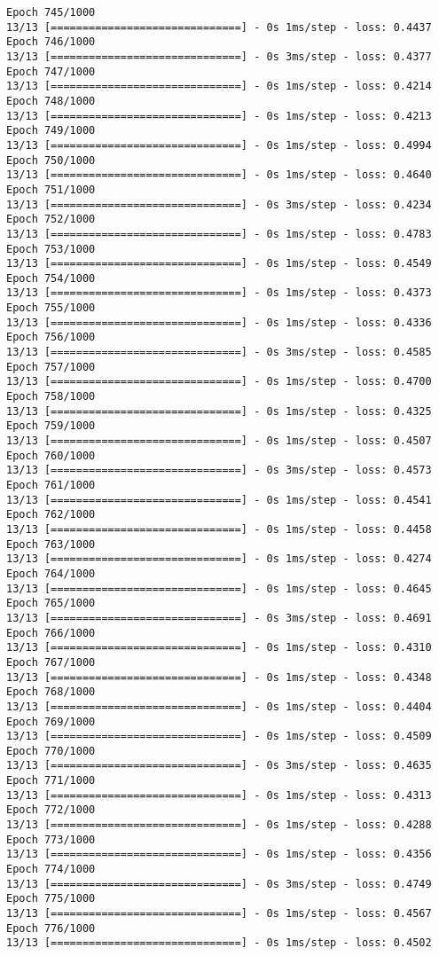 \documentclass[11pt]{article}
\begin{document}
\begin{Verbatim}[commandchars=\\\{\}]
Epoch 745/1000
13/13 [==============================] - 0s 1ms/step - loss: 0.4437
Epoch 746/1000
13/13 [==============================] - 0s 3ms/step - loss: 0.4377
Epoch 747/1000
13/13 [==============================] - 0s 1ms/step - loss: 0.4214
Epoch 748/1000
13/13 [==============================] - 0s 1ms/step - loss: 0.4213
Epoch 749/1000
13/13 [==============================] - 0s 1ms/step - loss: 0.4994
Epoch 750/1000
13/13 [==============================] - 0s 1ms/step - loss: 0.4640
Epoch 751/1000
13/13 [==============================] - 0s 3ms/step - loss: 0.4234
Epoch 752/1000
13/13 [==============================] - 0s 1ms/step - loss: 0.4783
Epoch 753/1000
13/13 [==============================] - 0s 1ms/step - loss: 0.4549
Epoch 754/1000
13/13 [==============================] - 0s 1ms/step - loss: 0.4373
Epoch 755/1000
13/13 [==============================] - 0s 1ms/step - loss: 0.4336
Epoch 756/1000
13/13 [==============================] - 0s 3ms/step - loss: 0.4585
Epoch 757/1000
13/13 [==============================] - 0s 1ms/step - loss: 0.4700
Epoch 758/1000
13/13 [==============================] - 0s 1ms/step - loss: 0.4325
Epoch 759/1000
13/13 [==============================] - 0s 1ms/step - loss: 0.4507
Epoch 760/1000
13/13 [==============================] - 0s 3ms/step - loss: 0.4573
Epoch 761/1000
13/13 [==============================] - 0s 1ms/step - loss: 0.4541
Epoch 762/1000
13/13 [==============================] - 0s 1ms/step - loss: 0.4458
Epoch 763/1000
13/13 [==============================] - 0s 1ms/step - loss: 0.4274
Epoch 764/1000
13/13 [==============================] - 0s 1ms/step - loss: 0.4645
Epoch 765/1000
13/13 [==============================] - 0s 3ms/step - loss: 0.4691
Epoch 766/1000
13/13 [==============================] - 0s 1ms/step - loss: 0.4310
Epoch 767/1000
13/13 [==============================] - 0s 1ms/step - loss: 0.4348
Epoch 768/1000
13/13 [==============================] - 0s 1ms/step - loss: 0.4404
Epoch 769/1000
13/13 [==============================] - 0s 1ms/step - loss: 0.4509
Epoch 770/1000
13/13 [==============================] - 0s 3ms/step - loss: 0.4635
Epoch 771/1000
13/13 [==============================] - 0s 1ms/step - loss: 0.4313
Epoch 772/1000
13/13 [==============================] - 0s 1ms/step - loss: 0.4288
Epoch 773/1000
13/13 [==============================] - 0s 1ms/step - loss: 0.4356
Epoch 774/1000
13/13 [==============================] - 0s 3ms/step - loss: 0.4749
Epoch 775/1000
13/13 [==============================] - 0s 1ms/step - loss: 0.4567
Epoch 776/1000
13/13 [==============================] - 0s 1ms/step - loss: 0.4502

\end{Verbatim}
\end{document}
